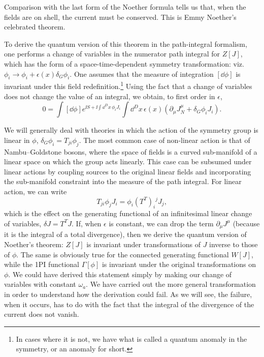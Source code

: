 Comparison with the last form of the Noether formula tells us that, when the
fields are on shell, the current must be conserved. This is Emmy Noether's
celebrated theorem.

To derive the quantum version of this theorem in the path-integral formalism,
one performs a change of variables in the numerator path integral for $Z[J]$,
which has the form of a space-time-dependent symmetry transformation: viz.
$\phi_i\to\phi_i+\epsilon(x)\delta_G\phi_i$. One assumes that the measure of
integration $[\dd\phi]$ is invariant under this field redefinition.\footnote[2]{In
cases where it is not, we have what is called a quantum anomaly in the
symmetry, or an anomaly for short.} Using the fact that a change of variables
does not change the value of an integral, we obtain, to first order in
$\epsilon$,
\begin{equation*}
  0=\int[\dd\phi]e^{\ii S+\ii\int\dd^D x\,\phi_iJ_i}
  \int\dd^D x\,\epsilon(x)
  \left(\partial_\mu J_N^\mu+\delta_G\phi_iJ_i\right).
\end{equation*}

We will generally deal with theories in which the action of the symmetry group
is linear in $\phi$, $\delta_G\phi_i=T_{ji}\phi_j$. The most common case of
non-linear action is that of Nambu--Goldstone bosons, where the space of fields
is a curved sub-manifold of a linear space on which the group acts linearly.
This case can be subsumed under linear actions by coupling sources to the
original linear fields and incorporating the sub-manifold constraint into the
measure of the path integral. For linear action, we can write
\begin{equation*}
  T_{ji}\phi_jJ_i=\phi_i(T^T)_i{}^jJ_j,
\end{equation*}
which is the effect on the generating functional of an infinitesimal linear
change of variables, $\delta J=T^T J$. If, when $\epsilon$ is constant, we can
drop the term $\partial_\mu J^\mu$ (because it is the integral of a total
divergence), then we derive the quantum version of Noether's theorem: $Z[J]$
is invariant under transformations of $J$ inverse to those of $\phi$. The same
is obviously true for the connected generating functional $W[J]$, while the
1PI functional $\Gamma[\phi]$ is invariant under the original transformations
on $\phi$. We could have derived this statement simply by making our change of
variables with constant $\omega_a$. We have carried out the more general
transformation in order to understand how the derivation could fail. As we
will see, the failure, when it occurs, has to do with the fact that the integral
of the divergence of the current does not vanish.


